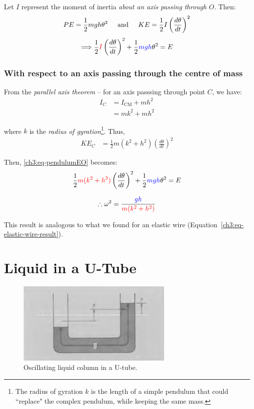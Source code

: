 \documentclass[11pt,letterpaper,titlepage,oneside]{book}
\newcommand{\htab}{\hspace{0.5cm}}
\newcommand{\andd}{\htab\text{and}\htab}
\newcommand{\kcol}[1]{\textcolor{blue}{#1}}
\newcommand{\mcol}[1]{\textcolor{red}{#1}}
\begin{document}
Let $I$ represent the moment of inertia \emph{about an axis passing through $O$}. Then:
\begin{equation*}
PE = \frac{1}{2} mgh\theta^2 \andd
KE = \frac{1}{2} I\left( \frac{d\theta}{dt} \right)^2
\end{equation*}
\begin{equation} 
	\Longrightarrow
	\frac{1}{2} \mcol{I}\left( \frac{d\theta}{dt} \right)^2 + \frac{1}{2} \kcol{mgh}\theta^2 = E \label{ch3:eq-pendulumEO}
\end{equation}

\subsubsection{With respect to an axis passing through the centre of mass}
From the \emph{parallel axis theorem} -- for an axis passsing through point $C$, we have:
\begin{align*}
	I_C &= I_\text{CM} + mh^2 \\
	&= mk^2 + mh^2
\end{align*}

where $k$ is the \emph{radius of gyration}\footnote{The radius of gyration $k$ is the length of a simple pendulum that could ``replace" the complex pendulum, while keeping the same mass.}. Thus,
\begin{align*}
	KE_C %
	&= \frac{1}{2} m(k^2 + h^2 ) \left( \frac{d\theta}{dt} \right)^2
\end{align*}

Then, \eqref{ch3:eq-pendulumEO} becomes:
\[ \frac{1}{2} \mcol{m(k^2+h^2)} \left( \frac{d\theta}{dt} \right)^2  + \frac{1}{2} \kcol{mgh}\theta^2 = E \]

\begin{equation*}
	\therefore \omega^2 = \frac{\kcol{gh}}{\mcol{m(k^2+h^2)}}
\end{equation*}

This result is analogous to what we found for an elastic wire (Equation~\ref{ch3:eq-elastic-wire-result}).

\section{Liquid in a U-Tube} \label{ch3:sec-uTube}

\begin{figure}[h]
	\centering
	\includegraphics[scale=0.8]{phys232/Ch3-utube.png} \caption{Oscillating liquid column in a U-tube.}\label{ch3:fig-utube}
\end{figure}
\end{document}
